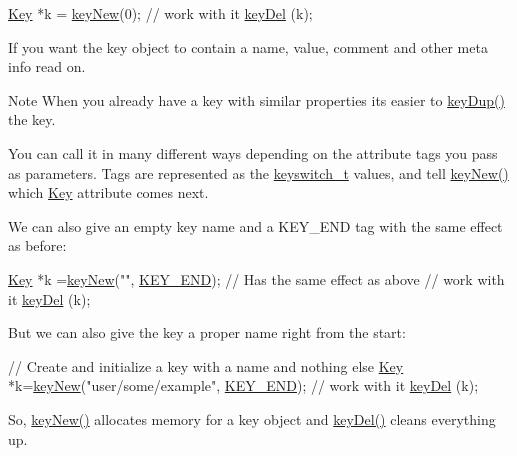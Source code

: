 \begin{DoxyCodeInclude}
\hyperlink{classkdb_1_1Key_a5679f5cae63caddd64a60388b9cc77fa}{Key} *k = \hyperlink{group__key_gad23c65b44bf48d773759e1f9a4d43b89}{keyNew}(0);
\textcolor{comment}{// work with it}
\hyperlink{group__key_ga3df95bbc2494e3e6703ece5639be5bb1}{keyDel} (k);
\end{DoxyCodeInclude}
 If you want the key object to contain a name, value, comment and other meta info read on.

\begin{DoxyNote}{Note}
When you already have a key with similar properties its easier to \hyperlink{group__key_gae6ec6a60cc4b8c1463fa08623d056ce3}{key\+Dup()} the key.
\end{DoxyNote}
You can call it in many different ways depending on the attribute tags you pass as parameters. Tags are represented as the \hyperlink{group__key_ga91fb3178848bd682000958089abbaf40}{keyswitch\+\_\+t} values, and tell \hyperlink{group__key_gad23c65b44bf48d773759e1f9a4d43b89}{key\+New()} which \hyperlink{classkdb_1_1Key}{Key} attribute comes next.

We can also give an empty key name and a K\+E\+Y\+\_\+\+E\+N\+D tag with the same effect as before\+:


\begin{DoxyCodeInclude}
\hyperlink{classkdb_1_1Key_a5679f5cae63caddd64a60388b9cc77fa}{Key} *k =\hyperlink{group__key_gad23c65b44bf48d773759e1f9a4d43b89}{keyNew}(\textcolor{stringliteral}{""}, \hyperlink{group__key_gga91fb3178848bd682000958089abbaf40aa8adb6fcb92dec58fb19410eacfdd403}{KEY\_END}); \textcolor{comment}{// Has the same effect as above}
\textcolor{comment}{// work with it}
\hyperlink{group__key_ga3df95bbc2494e3e6703ece5639be5bb1}{keyDel} (k);
\end{DoxyCodeInclude}
 But we can also give the key a proper name right from the start\+:


\begin{DoxyCodeInclude}
\textcolor{comment}{// Create and initialize a key with a name and nothing else}
\hyperlink{classkdb_1_1Key_a5679f5cae63caddd64a60388b9cc77fa}{Key} *k=\hyperlink{group__key_gad23c65b44bf48d773759e1f9a4d43b89}{keyNew}(\textcolor{stringliteral}{"user/some/example"}, \hyperlink{group__key_gga91fb3178848bd682000958089abbaf40aa8adb6fcb92dec58fb19410eacfdd403}{KEY\_END});
\textcolor{comment}{// work with it}
\hyperlink{group__key_ga3df95bbc2494e3e6703ece5639be5bb1}{keyDel} (k);
\end{DoxyCodeInclude}
 So, \hyperlink{group__key_gad23c65b44bf48d773759e1f9a4d43b89}{key\+New()} allocates memory for a key object and \hyperlink{group__key_ga3df95bbc2494e3e6703ece5639be5bb1}{key\+Del()} cleans everything up.

